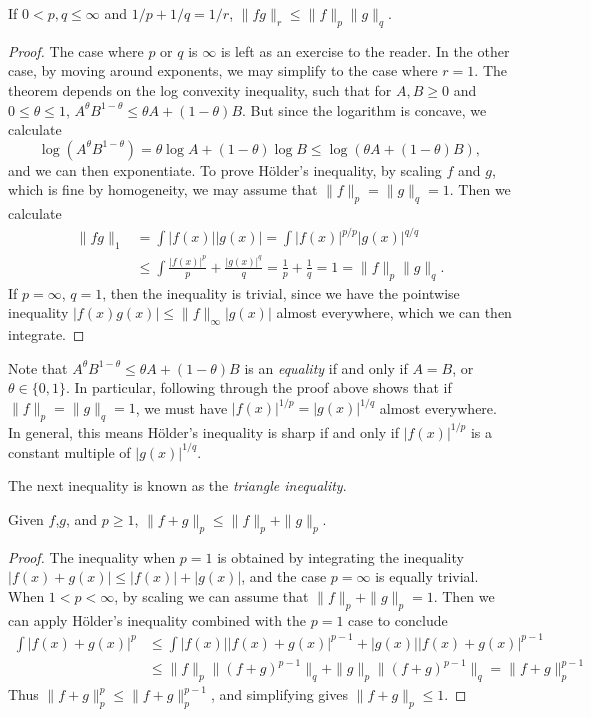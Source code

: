 \begin{theorem}[H\"{o}lder]
  If $0 < p,q \leq \infty$ and $1/p + 1/q = 1/r$, $\| f g \|_r \leq \| f \|_p \| g \|_q$.
\end{theorem}
\begin{proof}
  The case where $p$ or $q$ is $\infty$ is left as an exercise to the reader. In the other case, by moving around exponents, we may simplify to the case where $r = 1$. The theorem depends on the log convexity inequality, such that for $A,B \geq 0$ and $0 \leq \theta \leq 1$, $A^\theta B^{1 - \theta} \leq \theta A + (1 - \theta) B$. But since the logarithm is concave, we calculate
  \[ \log(A^\theta B^{1 - \theta}) = \theta \log A + (1 - \theta) \log B \leq \log(\theta A + (1 - \theta) B), \]
  and we can then exponentiate. To prove H\"{o}lder's inequality, by scaling $f$ and $g$, which is fine by homogeneity, we may assume that $\| f \|_p = \| g \|_q = 1$. Then we calculate
  \begin{align*}
    \| f g \|_1 &= \int |f(x)| |g(x)| = \int |f(x)|^{p/p} |g(x)|^{q/q}\\
    &\leq \int \frac{|f(x)|^p}{p} + \frac{|g(x)|^q}{q} = \frac{1}{p} + \frac{1}{q} = 1 = \| f \|_p \| g \|_q.
  \end{align*}
  If $p = \infty$, $q = 1$, then the inequality is trivial, since we have the pointwise inequality $|f(x) g(x)| \leq \| f \|_\infty |g(x)|$ almost everywhere, which we can then integrate.
\end{proof}

\begin{remark}
  Note that $A^\theta B^{1-\theta} \leq \theta A + (1 - \theta) B$ is an \emph{equality} if and only if $A = B$, or $\theta \in \{ 0, 1 \}$. In particular, following through the proof above shows that if $\| f \|_p = \| g \|_q = 1$, we must have $|f(x)|^{1/p} = |g(x)|^{1/q}$ almost everywhere. In general, this means H\"{o}lder's inequality is sharp if and only if $|f(x)|^{1/p}$ is a constant multiple of $|g(x)|^{1/q}$.
\end{remark}

The next inequality is known as the \emph{triangle inequality}.

\begin{corollary}
  Given $f$,$g$, and $p \geq 1$, $\| f + g \|_p \leq \| f \|_p + \| g \|_p$.
\end{corollary}
\begin{proof}
  The inequality when $p = 1$ is obtained by integrating the inequality $|f(x) + g(x)| \leq |f(x)| + |g(x)|$, and the case $p = \infty$ is equally trivial. When $1 < p < \infty$, by scaling we can assume that $\| f \|_p + \| g \|_p = 1$. Then we can apply H\"{o}lder's inequality combined with the $p = 1$ case to conclude
  \begin{align*}
    \int |f(x) + g(x)|^p &\leq \int |f(x)| |f(x) + g(x)|^{p-1} + |g(x)| |f(x) + g(x)|^{p-1}\\
    &\leq \| f \|_p \| (f + g)^{p-1} \|_q + \| g \|_p \| (f + g)^{p-1} \|_q = \| f + g \|_{p}^{p-1}
  \end{align*}
  Thus $\| f + g \|_p^p \leq \| f + g \|_p^{p-1}$, and simplifying gives $\| f + g \|_p \leq 1$.
\end{proof}

